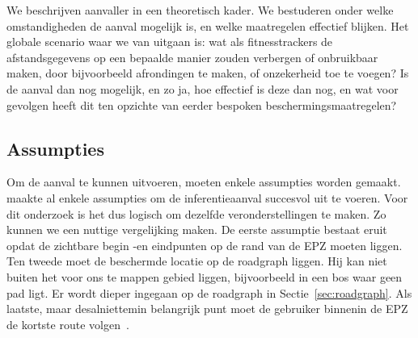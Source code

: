 We beschrijven aanvaller in een theoretisch kader. We bestuderen onder welke
omstandigheden de aanval mogelijk is, en welke maatregelen effectief blijken.
Het globale scenario waar we van uitgaan is: wat als fitnesstrackers de
afstandsgegevens op een bepaalde manier zouden verbergen of onbruikbaar maken,
door bijvoorbeeld afrondingen te maken, of onzekerheid toe te voegen? Is de
aanval dan nog mogelijk, en zo ja, hoe effectief is deze dan nog, en wat voor
gevolgen heeft dit ten opzichte van eerder bespoken beschermingsmaatregelen?

\subsection{Assumpties}\label{sec:assumpties}
Om de aanval te kunnen uitvoeren, moeten enkele assumpties worden gemaakt.
\citeauthor{Dhondt} maakte al enkele assumpties om de inferentieaanval
succesvol uit te voeren. Voor dit onderzoek is het dus logisch om dezelfde
veronderstellingen te maken. Zo kunnen we een nuttige vergelijking maken. De
eerste assumptie bestaat eruit opdat de zichtbare begin -en eindpunten op de
rand van de \ac{EPZ} moeten liggen. Ten tweede moet de beschermde locatie op de
roadgraph liggen. Hij kan niet buiten het voor ons te mappen gebied liggen,
bijvoorbeeld in een bos waar geen pad ligt. Er wordt dieper ingegaan op de
roadgraph in Sectie~\ref{sec:roadgraph}. Als laatste, maar desalniettemin
belangrijk punt moet de gebruiker binnenin de \ac{EPZ} de kortste route
volgen~\cite{Dhondt}.

